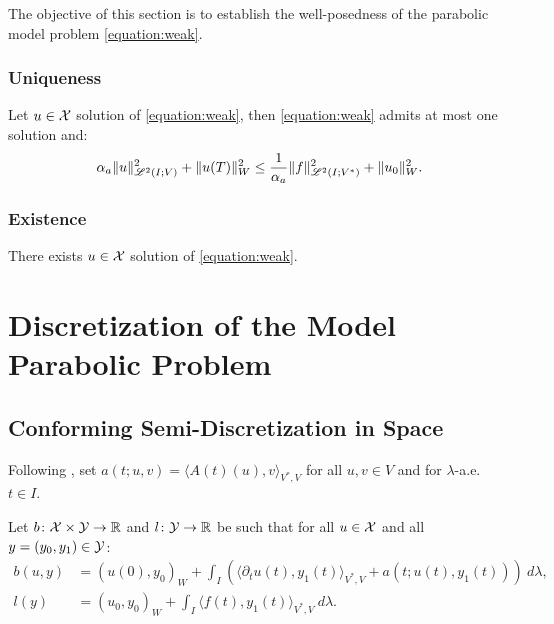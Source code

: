 The objective of this section is to establish the well-posedness of the parabolic model problem \cref{equation:weak}.

\subsubsection{Uniqueness}

\begin{lemma}
    Let $u \in \mathcal{X}$ solution of \cref{equation:weak}, then \cref{equation:weak} admits at most one solution and:
    \begin{align}
        \alpha_{a} \lVert u \rVert_{\mathscr{L}^{2}(I; V)}^2 + \lVert u(T) \rVert_W^2 \leq \frac{1}{\alpha_{a}} \lVert f \rVert_{\mathscr{L}^{2}(I; V^*)}^2 + \lVert u_0 \rVert_W^2.
    \end{align}
\end{lemma}



\subsubsection{Existence}

\begin{lemma}[Existence]
    There exists $u \in \mathcal{X}$ solution of \cref{equation:weak}.
\end{lemma}


\newpage
\section{Discretization of the Model Parabolic Problem}

\subsection{Conforming Semi-Discretization in Space}

Following \cite[p.~135]{Ern2021}, set $a(t; u, v) = \langle A(t)(u), v \rangle_{V^*, V}$ for all $u, v \in V$ and for $\lambda$-a.e. $t \in I$.

\begin{definition}[$b$ and $l$]
    Let $b \colon \mathcal{X} \times \mathcal{Y} \rightarrow \mathbb{R}$ and $l \colon \mathcal{Y} \rightarrow \mathbb{R}$ be such that for all $u \in \mathcal{X}$ and all $y = (y_0, y_1) \in \mathcal{Y}$:
    \begin{align}
        b(u, y) &= \left( u(0), y_0 \right)_W + \int_I \left( \langle \partial_t u(t), y_1(t) \rangle_{V^*, V} + a(t; u(t), y_1(t)) \right)~ d \lambda, \\
        l(y) &= \left( u_0, y_0 \right)_W + \int_I \langle f(t), y_1(t) \rangle_{V^*, V} ~ d \lambda.
    \end{align}
\end{definition}

